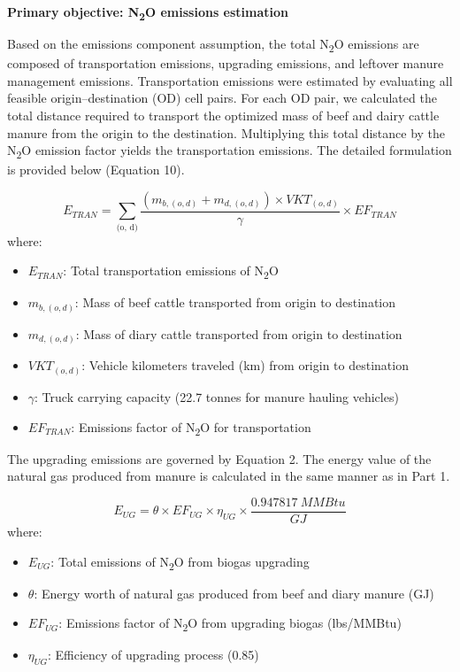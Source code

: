 \documentclass[12pt]{article}
\begin{document}
\textbf{Primary objective: N\textsubscript{2}O emissions estimation}

Based on the emissions component assumption, the total N\textsubscript{2}O emissions are composed of transportation emissions, upgrading emissions, and leftover manure management emissions. Transportation emissions were estimated by evaluating all feasible origin–destination (OD) cell pairs. For each OD pair, we calculated the total distance required to transport the optimized mass of beef and dairy cattle manure from the origin to the destination. Multiplying this total distance by the N\textsubscript{2}O emission factor yields the transportation emissions. The detailed formulation is provided below (Equation 10).

\begin{equation}
  E_{TRAN} = \sum_{\text{(o, d)}}\frac{(m_{b, (o, d)} + m_{d, (o, d)}) \times VKT_{(o, d)}}{\gamma} \times EF_{TRAN}
\end{equation}
where:
\begin{itemize}
  \item $E_{TRAN}$: Total transportation emissions of N\textsubscript{2}O
  \item $m_{b, (o, d)}$: Mass of beef cattle transported from origin to destination
  \item $m_{d, (o, d)}$: Mass of diary cattle transported from origin to destination
  \item $VKT_{(o, d)}$: Vehicle kilometers traveled (km) from origin to destination
  \item $\gamma$: Truck carrying capacity (22.7 tonnes for manure hauling vehicles)
  \item $EF_{TRAN}$: Emissions factor of N\textsubscript{2}O for transportation
\end{itemize}

The upgrading emissions are governed by Equation 2. The energy value of the natural gas produced from manure is calculated in the same manner as in Part 1.

\begin{equation}
  E_{UG} = \theta \times EF_{UG} \times \eta_{UG} \times \frac{0.947817 \ MMBtu}{GJ}
\end{equation}
where:
\begin{itemize}
  \item $E_{UG}$: Total emissions of N\textsubscript{2}O from biogas upgrading
  \item $\theta$: Energy worth of natural gas produced from beef and diary manure (GJ)
  \item $EF_{UG}$: Emissions factor of N\textsubscript{2}O from upgrading biogas (lbs/MMBtu)
  \item $\eta_{UG}$: Efficiency of upgrading process (0.85)
\end{itemize}
\end{document}
